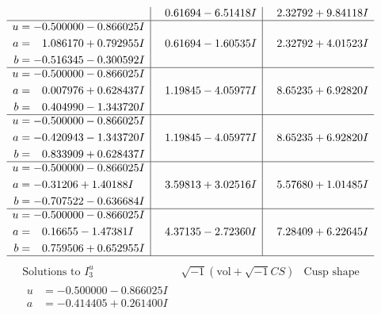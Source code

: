 \documentclass[1p]{elsarticle_modified}
\theoremstyle{definition}
\newcommand{\I}{\sqrt{-1}}
\begin{document}
$$\begin{array}{c|c|c}
 & \phantom{-}0.61694 - 6.51418 I & \phantom{-}2.32792 + 9.84118 I \\ \hline\begin{aligned}
u &= -0.500000 - 0.866025 I \\
a &= \phantom{-}1.086170 + 0.792955 I \\
b &= -0.516345 - 0.300592 I\end{aligned}
 & \phantom{-}0.61694 - 1.60535 I & \phantom{-}2.32792 + 4.01523 I \\ \hline\begin{aligned}
u &= -0.500000 - 0.866025 I \\
a &= \phantom{-}0.007976 + 0.628437 I \\
b &= \phantom{-}0.404990 - 1.343720 I\end{aligned}
 & \phantom{-}1.19845 - 4.05977 I & \phantom{-}8.65235 + 6.92820 I \\ \hline\begin{aligned}
u &= -0.500000 - 0.866025 I \\
a &= -0.420943 - 1.343720 I \\
b &= \phantom{-}0.833909 + 0.628437 I\end{aligned}
 & \phantom{-}1.19845 - 4.05977 I & \phantom{-}8.65235 + 6.92820 I \\ \hline\begin{aligned}
u &= -0.500000 - 0.866025 I \\
a &= -0.31206 + 1.40188 I \\
b &= -0.707522 - 0.636684 I\end{aligned}
 & \phantom{-}3.59813 + 3.02516 I & \phantom{-}5.57680 + 1.01485 I \\ \hline\begin{aligned}
u &= -0.500000 - 0.866025 I \\
a &= \phantom{-}0.16655 - 1.47381 I \\
b &= \phantom{-}0.759506 + 0.652955 I\end{aligned}
 & \phantom{-}4.37135 - 2.72360 I & \phantom{-}7.28409 + 6.22645 I\\
 \hline 
 \end{array}$$\newpage$$\begin{array}{c|c|c}  
\text{Solutions to }I^u_{3}& \I (\text{vol} + \sqrt{-1}CS) & \text{Cusp shape}\\
 \hline 
\begin{aligned}
u &= -0.500000 - 0.866025 I \\
a &= -0.414405 + 0.261400 I \\

\end{aligned}
\end{array}$$
\end{document}
